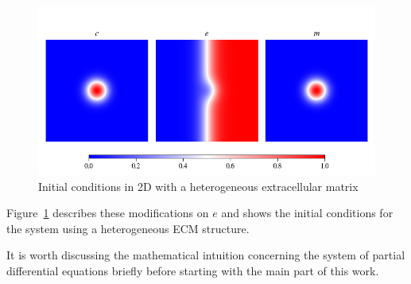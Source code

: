 \begin{figure}[h]
    \centering
    \label{fig:Initial_Value_Distribution}
    \includegraphics[width=\textwidth]{resources/images/2D_initial_conditions_heterogenous_ECM.png}
    \caption{Initial conditions in 2D with a heterogeneous extracellular matrix}
    \label{fig:2D_heterogenous_ECM_initial}
\end{figure}
Figure~\ref{fig:2D_heterogenous_ECM_initial} describes these modifications on $e$ and shows the initial conditions for the system using a heterogeneous ECM structure.
  
It is worth discussing the mathematical intuition concerning the system of partial differential equations briefly before starting with the main part of this work. 

